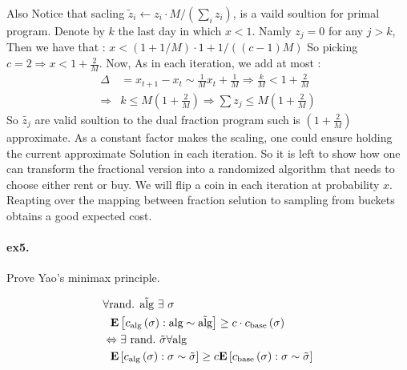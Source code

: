 \documentclass{article}
\begin{document}
\begin{multicols*}{2}
Also Notice that sacling $\tilde{z}_{i} \leftarrow z_{i} \cdot M / \left( \sum_{i}z_{i}  \right)$, is a vaild soultion for primal program. Denote by $k$ the last day in which  $x < 1$. Namly $z_{j} = 0 $ for any $j > k$, Then we have that :  $x < \left( 1 + 1/M  \right)\cdot 1 + 1 / \left( \left( c-1 \right)M \right) $ So picking $c = 2 \Rightarrow x < 1 + \frac{2}{M}$.
  Now, As in each iteration, we add at most : 
  \begin{equation*}
    \begin{split}
      \Delta  & = x_{t+1} - x_{t} \sim \frac{1}{M} x_{t} + \frac{1}{M} \Rightarrow \frac{k}{M} < 1+ \frac{2}{M} \\
      \Rightarrow & k \le M\left( 1 + \frac{2}{M} \right) \Rightarrow \sum{z_{j}}\le M\left( 1 + \frac{2}{M} \right)
    \end{split}
  \end{equation*}
So $\tilde{z_{j}}$ are valid soultion to the dual fraction program such is $ \left( 1 + \frac{2}{M} \right)$ approximate. As a constant factor makes the scaling, one could ensure holding the current approximate Solution in each iteration.   
So it is left to show how one can transform the fractional version into a randomized algorithm that needs to choose either rent or buy. We will flip a coin in each iteration at probability $x$. Reapting over the mapping between fraction selution to sampling from buckets obtains a good expected cost.  
  \paragraph{ex5.} Prove Yao's minimax principle. 

  \begin{equation*}
    \begin{split}
      & \forall \text{rand. } \tilde{\text{alg}} \  \exists  \ \sigma  \\
      & \ \ \dalg{ \calg\left( \sigma \right) } \ge c \cdot   \cbase\left( \sigma \right) \\  
      & \Leftrightarrow \exists \ \text{rand.} \ \tilde{\sigma} \forall \text{alg} \\  
      & \ \ \dsig{  \calg\left( \sigma \right)  } \ge c \dsig{ \cbase \left( \sigma \right)  } 
    \end{split}
  \end{equation*}

\end{multicols*}
\end{document}
